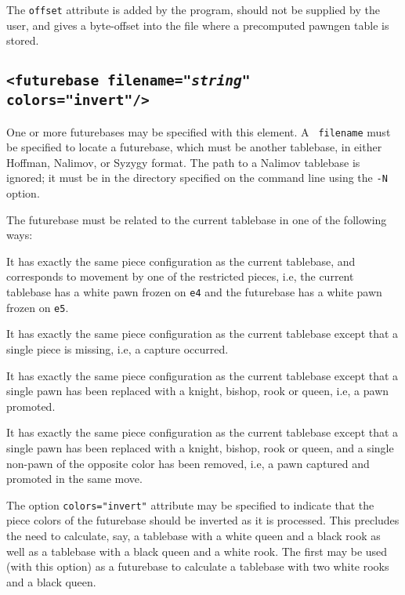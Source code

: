 \documentclass[11pt]{article}
\begin{document}
The {\tt offset} attribute is added by the program, should not
be supplied by the user, and gives a byte-offset into the file
where a precomputed pawngen table is stored.

\subsection{\tt <futurebase filename="{\it string}" colors="invert"/>}

One or more futurebases may be specified with this element.  A {\tt
  filename} must be specified to locate a futurebase, which must be
another tablebase, in either Hoffman, Nalimov, or Syzygy format.  The
path to a Nalimov tablebase is ignored; it must be in the directory
specified on the command line using the {\tt -N} option.

The futurebase must be related to the current tablebase in one of the
following ways:

\begin{description}
\item It has exactly the same piece configuration as the
current tablebase, and corresponds to movement by one of the
restricted pieces, i.e, the current tablebase has a white pawn frozen
on {\tt e4} and the futurebase has a white pawn frozen on {\tt e5}.

\item It has exactly the same piece configuration as
the current tablebase except that a single piece is missing, i.e,
a capture occurred.

\item It has exactly the same piece configuration as the current
tablebase except that a single pawn has been replaced with a knight,
bishop, rook or queen, i.e, a pawn promoted.

\item It has exactly the same piece configuration as the current
tablebase except that a single pawn has been replaced with a knight,
bishop, rook or queen, and a single non-pawn of the opposite color has
been removed, i.e, a pawn captured and promoted in the same move.

\end{description}

The option {\tt colors="invert"} attribute may be specified to indicate
that the piece colors of the futurebase should be inverted as it is
processed.  This precludes the need to calculate, say, a tablebase
with a white queen and a black rook as well as a tablebase with a
black queen and a white rook.  The first may be used (with this
option) as a futurebase to calculate a tablebase with two white rooks
and a black queen.
\end{document}
